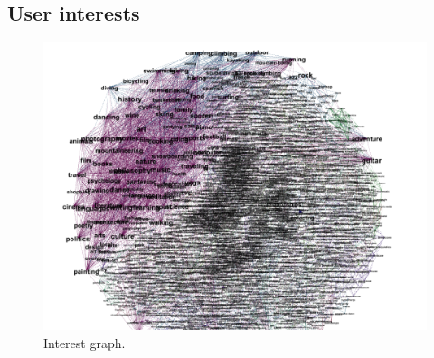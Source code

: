 \begin{figure}[ht]
\centering
{}
\caption{}
\label{fig:timeline_view}
\end{figure}

\subsection{User interests}

\begin{figure}[ht]
\centering
\includegraphics[width=1\linewidth]{figures/interest_graph.png}
\caption{Interest graph.}
\label{fig:interest_graph}
\end{figure}
